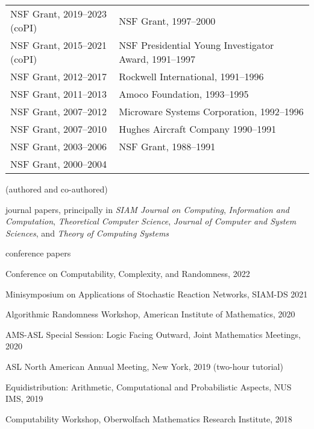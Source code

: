 \documentclass[12pt]{article}
\begin{document}
\begin{tabular}{@{\hspace*{-2pt}}l@{\hspace*{43pt}}l}
NSF Grant, 2019--2023 (coPI) & NSF Grant, 1997--2000 \\
NSF Grant, 2015--2021 (coPI) & NSF Presidential Young Investigator Award, 1991--1997  \\   
NSF Grant, 2012--2017 & Rockwell International, 1991--1996  \\
NSF Grant, 2011--2013 & Amoco Foundation, 1993--1995  \\
NSF Grant, 2007--2012 & Microware Systems Corporation, 1992--1996  \\
NSF Grant, 2007--2010 & Hughes Aircraft Company 1990--1991  \\
NSF Grant, 2003--2006 & NSF Grant, 1988--1991 \\
NSF Grant, 2000--2004 &
\end{tabular}


\vspace{0.2cm}

 (authored and co-authored)

 journal papers, principally in {\it SIAM Journal on Computing},
{\it Information and Computation},
{\it Theoretical Computer Science},
{\it Journal of Computer and System Sciences},
and {\it Theory of Computing Systems}

 conference papers


\vspace{0.2cm}



\indent Conference on Computability, Complexity, and Randomness, 2022

\indent Minisymposium on Applications of Stochastic Reaction Networks, SIAM-DS 2021

\indent Algorithmic Randomness Workshop, American Institute of Mathematics, 2020

\indent AMS-ASL Special Session: Logic Facing Outward, Joint Mathematics Meetings, 2020

\indent ASL North American Annual Meeting, New York, 2019 (two-hour tutorial)

\indent Equidistribution: Arithmetic, Computational and Probabilistic Aspects, NUS IMS, 2019

\indent Computability Workshop, Oberwolfach Mathematics Research Institute, 2018
\end{document}
